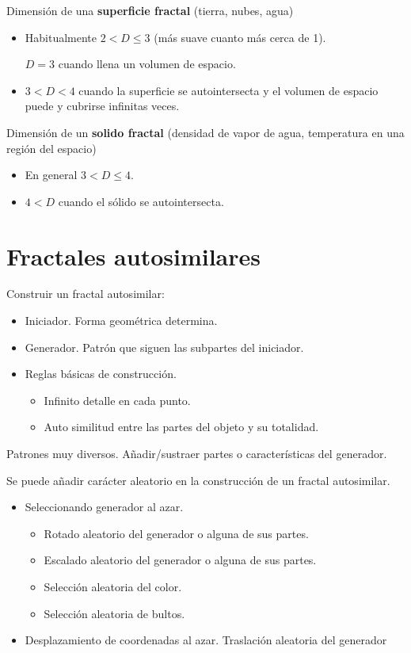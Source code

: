 Dimensión de una \textbf{superficie fractal} (tierra, nubes, agua)
\begin{itemize}
	\item Habitualmente $2 < D \leq 3$ (más suave cuanto más cerca de 1).

	      $D = 3$ cuando llena un volumen de espacio.
	\item $3 < D < 4$ cuando la superficie se autointersecta y el volumen de espacio puede y cubrirse infinitas veces.
\end{itemize}

Dimensión de un \textbf{solido fractal} (densidad de vapor de agua, temperatura en una región del espacio)
\begin{itemize}
	\item En general $3 < D \leq 4$.
	\item $4 < D$ cuando el sólido se autointersecta.
\end{itemize}

\section{Fractales autosimilares}
Construir un fractal autosimilar:
\begin{itemize}
	\item Iniciador. Forma geométrica determina.
	\item Generador. Patrón que siguen las subpartes del iniciador.
	\item Reglas básicas de construcción.
	      \begin{itemize}
		      \item Infinito detalle en cada punto.
		      \item Auto similitud entre las partes del objeto y su totalidad.
	      \end{itemize}
\end{itemize}

Patrones muy diversos. Añadir/sustraer partes o características del generador.

Se puede añadir carácter aleatorio en la construcción de un fractal autosimilar.
\begin{itemize}
	\item Seleccionando generador al azar.
	      \begin{itemize}
		      \item Rotado aleatorio del generador o alguna de sus partes.
		      \item Escalado aleatorio del generador o alguna de sus partes.
		      \item Selección aleatoria del color.
		      \item Selección aleatoria de bultos.
	      \end{itemize}
	\item Desplazamiento de coordenadas al azar. Traslación aleatoria del generador
\end{itemize}

